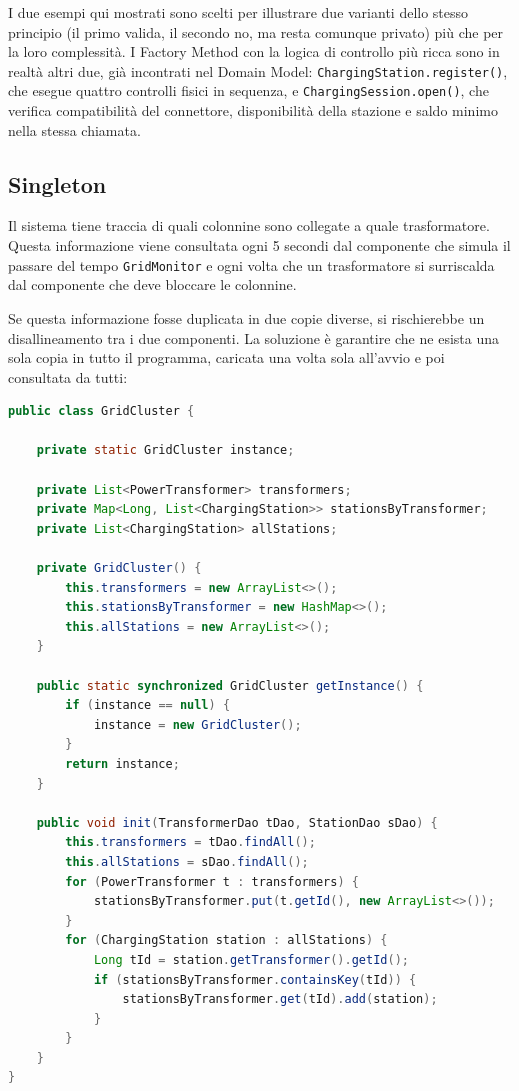 I due esempi qui mostrati sono scelti per illustrare due varianti dello stesso principio (il primo valida, il secondo no, ma resta comunque privato) più che per la loro complessità. I Factory Method con la logica di controllo più ricca sono in realtà altri due, già incontrati nel Domain Model: \texttt{ChargingStation.register()}, che esegue quattro controlli fisici in sequenza, e \texttt{ChargingSession.open()}, che verifica compatibilità del connettore, disponibilità della stazione e saldo minimo nella stessa chiamata.

\subsection{Singleton}
\label{sec:singleton-gridcluster}

Il sistema tiene traccia di quali colonnine sono collegate a quale trasformatore. Questa informazione viene consultata ogni 5 secondi dal componente che simula il passare del tempo \texttt{GridMonitor} e ogni volta che un trasformatore si surriscalda dal componente che deve bloccare le colonnine.

Se questa informazione fosse duplicata in due copie diverse, si rischierebbe un disallineamento tra i due componenti. La soluzione è garantire che ne esista una sola copia in tutto il programma, caricata una volta sola all'avvio e poi consultata da tutti:

\vspace{0.3cm}
\noindent\begin{minipage}{\linewidth}
\begin{lstlisting}[language=java, caption={Singleton GridCluster per la cache della rete}]
public class GridCluster {

    private static GridCluster instance;

    private List<PowerTransformer> transformers;
    private Map<Long, List<ChargingStation>> stationsByTransformer;
    private List<ChargingStation> allStations;

    private GridCluster() {
        this.transformers = new ArrayList<>();
        this.stationsByTransformer = new HashMap<>();
        this.allStations = new ArrayList<>();
    }

    public static synchronized GridCluster getInstance() {
        if (instance == null) {
            instance = new GridCluster();
        }
        return instance;
    }

    public void init(TransformerDao tDao, StationDao sDao) {
        this.transformers = tDao.findAll();
        this.allStations = sDao.findAll();
        for (PowerTransformer t : transformers) {
            stationsByTransformer.put(t.getId(), new ArrayList<>());
        }
        for (ChargingStation station : allStations) {
            Long tId = station.getTransformer().getId();
            if (stationsByTransformer.containsKey(tId)) {
                stationsByTransformer.get(tId).add(station);
            }
        }
    }
}
\end{lstlisting}
\end{minipage}
\vspace{0.3cm}

